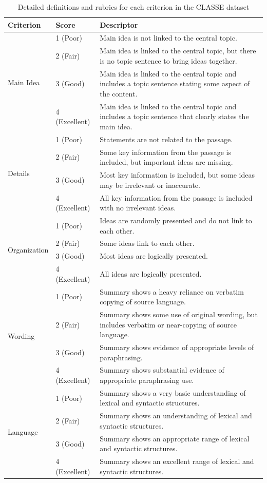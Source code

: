 \documentclass[letterpaper]{article} %
\begin{document}
\begin{table}[h]
\centering
\renewcommand{\arraystretch}{1.4}
\begin{tabular}{|p{3.5cm}|p{2cm}|p{8.5cm}|}
\hline
\textbf{Criterion} & \textbf{Score} & \textbf{Descriptor} \\
\hline
\multirow{4}{=}{Main Idea}
& 1 (Poor) & Main idea is not linked to the central topic. \\
& 2 (Fair) & Main idea is linked to the central topic, but there is no topic sentence to bring ideas together. \\
& 3 (Good) & Main idea is linked to the central topic and includes a topic sentence stating some aspect of the content. \\
& 4 (Excellent) & Main idea is linked to the central topic and includes a topic sentence that clearly states the main idea. \\
\hline
\multirow{4}{=}{Details}
& 1 (Poor) & Statements are not related to the passage. \\
& 2 (Fair) & Some key information from the passage is included, but important ideas are missing. \\
& 3 (Good) & Most key information is included, but some ideas may be irrelevant or inaccurate. \\
& 4 (Excellent) & All key information from the passage is included with no irrelevant ideas. \\
\hline
\multirow{4}{=}{Organization}
& 1 (Poor) & Ideas are randomly presented and do not link to each other. \\
& 2 (Fair) & Some ideas link to each other. \\
& 3 (Good) & Most ideas are logically presented. \\
& 4 (Excellent) & All ideas are logically presented. \\
\hline
\multirow{4}{=}{Wording}
& 1 (Poor) & Summary shows a heavy reliance on verbatim copying of source language. \\
& 2 (Fair) & Summary shows some use of original wording, but includes verbatim or near-copying of source language. \\
& 3 (Good) & Summary shows evidence of appropriate levels of paraphrasing. \\
& 4 (Excellent) & Summary shows substantial evidence of appropriate paraphrasing use. \\
\hline
\multirow{4}{=}{Language}
& 1 (Poor) & Summary shows a very basic understanding of lexical and syntactic structures. \\
& 2 (Fair) & Summary shows an understanding of lexical and syntactic structures. \\
& 3 (Good) & Summary shows an appropriate range of lexical and syntactic structures. \\
& 4 (Excellent) & Summary shows an excellent range of lexical and syntactic structures. \\
\hline
\end{tabular}
\caption{Detailed definitions and rubrics for each criterion in the CLASSE dataset}
\label{apx:rubric}
\end{table}
\end{document}
